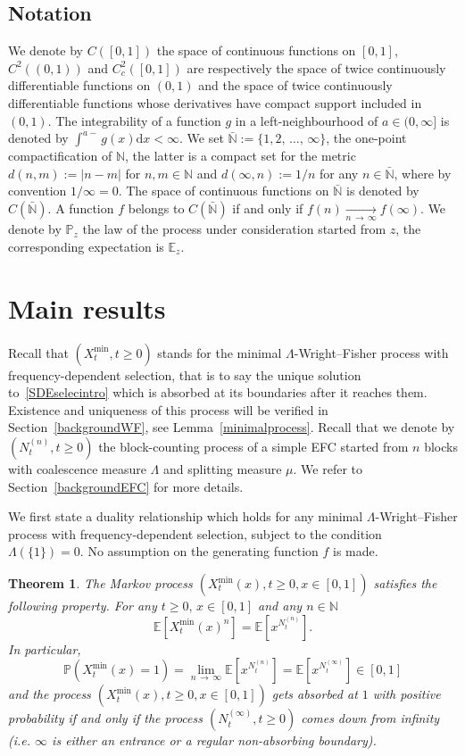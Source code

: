 \documentclass[10pt]{amsart}
\newtheorem{theo}{Theorem}[section]
\theoremstyle{definition}\newtheorem{defi}[theo]{Definition}\newtheorem{rema}[theo]{Remark}\newtheorem{exam}[theo]{Example}\newtheorem{exem}[theo]{Example}\newtheorem{nota}[theo]{Notation}
\newcommand{\ddr}{\mathrm{d}}
\newcommand{\bbN}{\mathbb{N}}
\newcommand{\bbE}{\mathbb{E}}
\newcommand{\bbP}{\mathbb{P}}
\begin{document}
\subsection*{Notation}
We denote by $C([0,1])$ the space of continuous functions on $[0,1]$, $C^{2}((0,1))$ and $C^2_c([0,1])$ are respectively the space of twice continuously differentiable functions on $(0,1)$ and the space of twice continuously differentiable functions whose derivatives have compact support included in $(0,1)$. The integrability of a function $g$ in a left-neighbourhood of $a\in (0,\infty]$ is denoted by $\int^{a-}g(x)\ddr x<\infty$. We set $\bar{\bbN}:=\{1,2,\,\ldots,\,\infty\}$, the one-point compactification of $\bbN$, the latter is a compact set for the metric $d(n,m):=|n-m|$ for $n,m\in \bbN$ and $d(\infty,n):=1/n$ for any $n\in \bar{\bbN}$, where by convention $1/\infty =0$. The space of continuous functions on $\bar{\bbN}$ is denoted by $C(\bar{\bbN})$. A function $f$ belongs to $C(\bar{\bbN})$ if and only if $f(n)\underset{n\,\rightarrow\,\infty}{\longrightarrow} f(\infty)$. We denote by $\bbP_z$ the law of the process under consideration started from $z$, the corresponding expectation is $\bbE_z$.



\section{Main results}\label{mainresults}
Recall that $(X_t^{\min},t\geq 0)$ stands for the minimal $\Lambda$-Wright--Fisher process with frequency-dependent selection, that is to say the unique solution to~\eqref{SDEselecintro} which is absorbed at its boundaries after it reaches them. Existence and uniqueness of this process will be verified in Section~\ref{backgroundWF}, see Lemma~\ref{minimalprocess}. Recall that we denote by $(N_t^{(n)},t\geq 0)$ the block-counting process of a simple EFC started from $n$ blocks with coalescence measure $\Lambda$ and splitting measure $\mu$. We refer to Section~\ref{backgroundEFC} for more details.

We first state a duality relationship which holds for any minimal $\Lambda$-Wright--Fisher process with frequency-dependent selection, subject to the condition $\Lambda(\{1\})=0$. No assumption on the generating function $f$ is made.

\begin{theo}\label{thmmomentdual1}
The Markov process $(X_t^{\min}(x),t\geq 0,x\in [0,1])$ satisfies the following property. For any $t\geq 0,\, x\in [0,1]$ and any $n\in \bbN$
\begin{equation}\label{dualEFC}
\bbE\left[X^{\min}_t(x)^{n}\right]=\bbE\left[x^{N^{(n)}_t}\right].
\end{equation}
In particular,
\[
\bbP\left(X^{\min}_t(x)=1\right)=\underset{n\,\rightarrow\, \infty}{\lim}\bbE\left[x^{N^{(n)}_t}\right]= \bbE\left[x^{N^{(\infty)}_t}\right]\in [0,1]
\]
and the process $(X^{\min}_t(x),t\geq 0, x\in[0,1])$ gets absorbed at $1$ with positive probability if and only if the process $(N^{(\infty)}_t,t\geq 0)$ comes down from infinity (i.e. $\infty$ is either an entrance or a regular non-absorbing boundary).
\end{theo}
\end{document}
